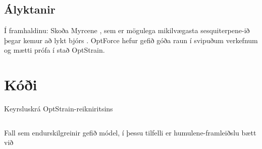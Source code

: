 \documentclass[11pt]{article}
\newcommand{\matlab}[1]{\inputminted[linenos, frame=lines, label=#1, fontsize=\small]{matlab}{#1}}
\begin{document}
\begin{multicols}{2}
\section{Ályktanir}


Í framhaldinu: Skoða Myrcene \cite[KEGG: C06074]{Kanehisa01012000}, sem er mögulega mikilvægasta sesquiterpene-ið þegar kemur að lykt bjórs \cite{guadagni1966odour}. OptForce\cite{ranganathan2010optforce} hefur gefið góða raun í svipuðum verkefnum og mætti prófa í stað OptStrain.




\end{multicols}


\clearpage
\appendix
\section{Kóði}
\begin{listing}[H]
\caption{Keyrsluskrá OptStrain-reikniritsins}
\label{code:OptStrain}
\matlab{../OptStrain.m}
\end{listing}

\begin{listing}[H]
\caption{Fall sem endurskilgreinir gefið módel, í þessu tilfelli er humulene-framleiðslu bætt við}
\label{code:addTargetMetabolite}
\matlab{../addTargetMetabolite.m}
\end{listing}
\end{document}
